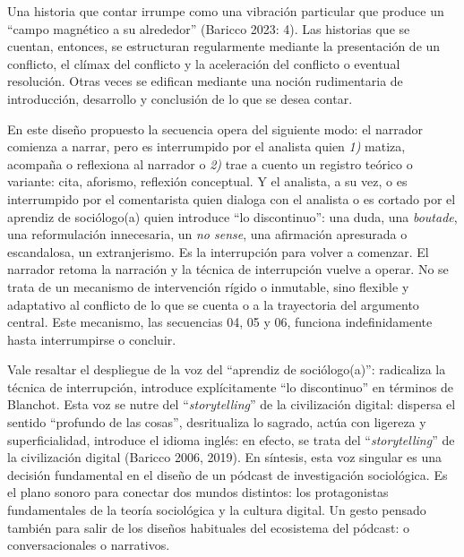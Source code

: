 \documentclass[
]{interact}
\begin{document}
Una historia que contar irrumpe como una vibración particular que
produce un ``campo magnético a su alrededor'' (Baricco 2023: 4). Las
historias que se cuentan, entonces, se estructuran regularmente mediante
la presentación de un conflicto, el clímax del conflicto y la
aceleración del conflicto o eventual resolución. Otras veces se edifican
mediante una noción rudimentaria de introducción, desarrollo y
conclusión de lo que se desea contar.

En este diseño propuesto la secuencia opera del siguiente modo: el
narrador comienza a narrar, pero es interrumpido por el analista quien
\emph{1)} matiza, acompaña o reflexiona al narrador o \emph{2)} trae a
cuento un registro teórico o variante: cita, aforismo, reflexión
conceptual. Y el analista, a su vez, o es interrumpido por el
comentarista quien dialoga con el analista o es cortado por el aprendiz
de sociólogo(a) quien introduce ``lo discontinuo'': una duda, una
\emph{boutade}, una reformulación innecesaria, un \emph{no sense}, una
afirmación apresurada o escandalosa, un extranjerismo. Es la
interrupción para volver a comenzar. El narrador retoma la narración y
la técnica de interrupción vuelve a operar. No se trata de un mecanismo
de intervención rígido o inmutable, sino flexible y adaptativo al
conflicto de lo que se cuenta o a la trayectoria del argumento central.
Este mecanismo, las secuencias 04, 05 y 06, funciona indefinidamente
hasta interrumpirse o concluir.

Vale resaltar el despliegue de la voz del ``aprendiz de sociólogo(a)'':
radicaliza la técnica de interrupción, introduce explícitamente ``lo
discontinuo'' en términos de Blanchot. Esta voz se nutre del
``\emph{storytelling}'' de la civilización digital: dispersa el sentido
``profundo de las cosas'', desritualiza lo sagrado, actúa con ligereza y
superficialidad, introduce el idioma inglés: en efecto, se trata del
``\emph{storytelling}'' de la civilización digital (Baricco 2006, 2019).
En síntesis, esta voz singular es una decisión fundamental en el diseño
de un pódcast de investigación sociológica. Es el plano sonoro para
conectar dos mundos distintos: los protagonistas fundamentales de la
teoría sociológica y la cultura digital. Un gesto pensado también para
salir de los diseños habituales del ecosistema del pódcast: o
conversacionales o narrativos.
\end{document}
